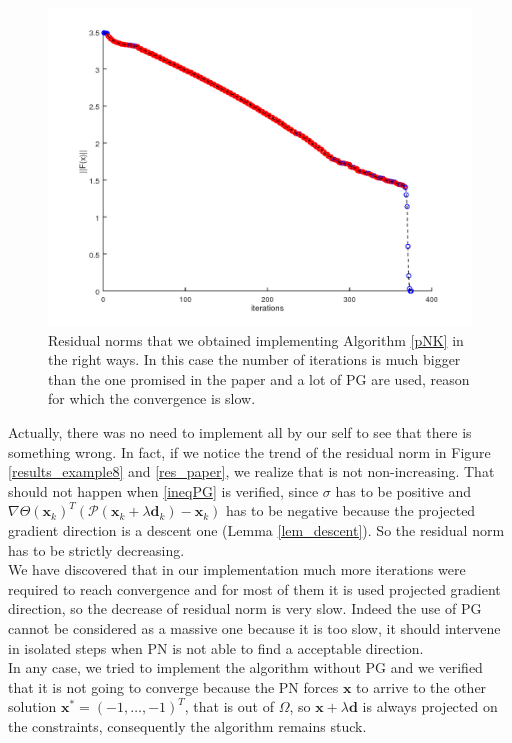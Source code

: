 \begin{figure}[h]
	\centering
	\includegraphics[width=0.8\linewidth]{res_our}
	\caption[Plot of residuals found by us]{Residual norms that we obtained implementing Algorithm \ref{pNK} in the right ways. In this case the number of iterations is much bigger than the one promised in the paper and a lot of PG are used, reason for which the convergence is slow.}
	\label{res_our}
\end{figure}
Actually, there was no need to implement all by our self to see that there is something wrong. In fact, if we notice the trend of the residual norm in Figure \ref{results_example8} and \ref{res_paper}, we realize that is not non-increasing. That should not happen when \eqref{ineqPG} is verified, since $ \sigma $ has to be positive and $\nabla \Theta(\textbf{x}_k)^T (\mathcal{P}(\textbf{x}_k + \lambda \textbf{d}_k)- \textbf{x}_k)  $ has to be negative because the projected gradient direction is a descent one (Lemma \ref{lem_descent}). So the residual norm has to be strictly decreasing. \\
We have discovered that in our implementation much more iterations were required to reach convergence and for most of them it is used projected gradient direction, so the decrease of residual norm is very slow. Indeed the use of PG cannot be considered as a massive one because it is too slow, it should intervene in isolated steps when PN is not able to find a acceptable direction. \\
In any case, we tried to implement the algorithm without PG and we verified that it is not going to converge because the PN forces $\textbf{x} $ to arrive to the other solution $ \textbf{x}^* = (-1, \dots, -1)^T$, that is out of $ \Omega $, so $ \textbf{x} + \lambda \textbf{d} $ is always projected on the constraints, consequently the algorithm remains stuck. 
